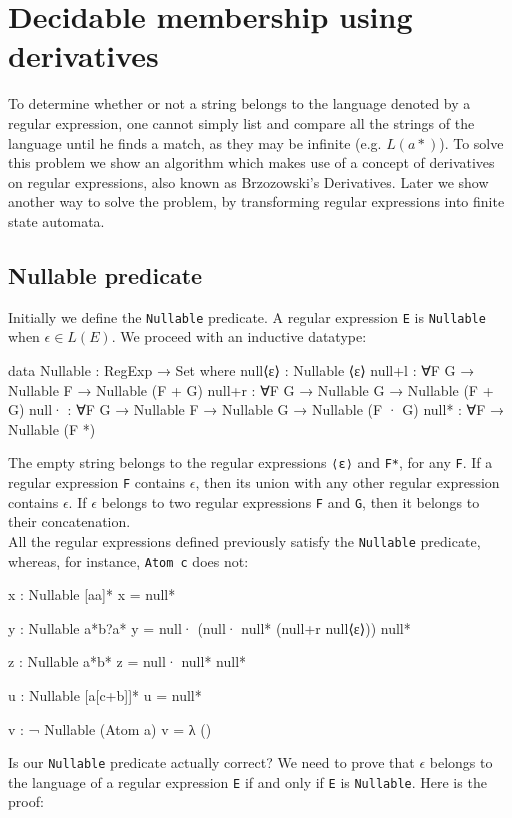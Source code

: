 \section{Decidable membership using derivatives}
To determine whether or not a string belongs to the language denoted by a regular expression, one cannot simply list and compare all the strings of the language until he finds a match, as they may be infinite (e.g. $L(a*)$). To solve this problem we show an algorithm which makes use of a concept of derivatives on regular expressions, also known as Brzozowski's Derivatives. Later we show another way to solve the problem, by transforming regular expressions into finite state automata.

\subsection{Nullable predicate}
Initially we define the \texttt{Nullable} predicate. A regular expression \texttt{E} is \texttt{Nullable} when $\epsilon \in L(E)$. We proceed with an inductive datatype:
\begin{agda}
data Nullable : RegExp → Set where
  null⟨ε⟩ : Nullable ⟨ε⟩
  null+l : ∀{F G} → Nullable F → Nullable (F + G)
  null+r : ∀{F G} → Nullable G → Nullable (F + G)
  null·  : ∀{F G} → Nullable F → Nullable G → Nullable (F · G)
  null*  : ∀{F} → Nullable (F *)
\end{agda}
The empty string belongs to the regular expressions \texttt{⟨ε⟩} and \texttt{F*}, for any \texttt{F}. If a regular expression \texttt{F} contains $\epsilon$, then its union with any other regular expression contains $\epsilon$. If $\epsilon$ belongs to two regular expressions \texttt{F} and \texttt{G}, then it belongs to their concatenation.\\
All the regular expressions defined previously satisfy the \texttt{Nullable} predicate, whereas, for instance, \texttt{Atom c} does not:
\begin{agda}
x : Nullable [aa]*
x = null*

y : Nullable a*b?a*
y = null· (null· null* (null+r null⟨ε⟩)) null*

z : Nullable a*b*
z = null· null* null*

u : Nullable [a[c+b]]*
u = null*

v : ¬ Nullable (Atom a)
v = λ ()
\end{agda}
Is our \texttt{Nullable} predicate actually correct? We need to prove that $\epsilon$ belongs to the language of a regular expression \texttt{E} if and only if \texttt{E} is \texttt{Nullable}. Here is the proof:

